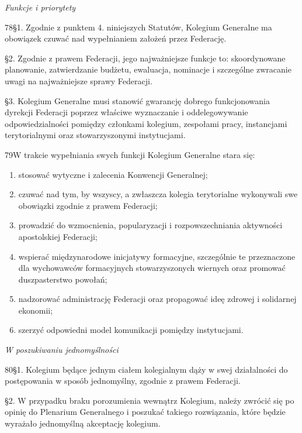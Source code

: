 ﻿\documentclass{book}
\newcommand{\lett}[1]{\lettrine[findent=6pt]{#1}}
\newcommand{\ssec}[1]{\vspace{1em}\textit{#1}\vspace{.5em}\nopagebreak}
\begin{document}
\ssec{Funkcje i priorytety}


\lett{78} \S{}1. Zgodnie z punktem 4. niniejszych Statutów, Kolegium Generalne ma obowiązek czuwać nad wypełnianiem założeń przez Federację.


\S{}2. Zgodnie z prawem Federacji, jego najważniejsze funkcje to: skoordynowane planowanie, zatwierdzanie budżetu, ewaluacja, nominacje i szczególne zwracanie uwagi na najważniejsze sprawy Federacji.


\S{}3. Kolegium Generalne musi stanowić gwarancję dobrego funkcjonowania dyrekcji Federacji poprzez właściwe wyznaczanie i oddelegowywanie odpowiedzialności pomiędzy członkami kolegium, zespołami pracy, instancjami terytorialnymi oraz stowarzyszonymi instytucjami.


\lett{79} W trakcie wypełniania swych funkcji Kolegium Generalne stara się:


\begin{enumerate}


\item stosować wytyczne i zalecenia Konwencji Generalnej;


\item czuwać nad tym, by wszyscy, a zwłaszcza kolegia terytorialne wykonywali swe obowiązki zgodnie z prawem Federacji;


\item prowadzić do wzmocnienia, popularyzacji i rozpowszechniania aktywności apostolskiej Federacji;


\item wspierać międzynarodowe inicjatywy formacyjne, szczególnie te przeznaczone dla wychowawców formacyjnych stowarzyszonych wiernych oraz promować duszpasterstwo powołań;


\item nadzorować administrację Federacji oraz propagować ideę zdrowej i solidarnej ekonomii;


\item szerzyć odpowiedni model komunikacji pomiędzy instytucjami.


\end{enumerate}
 
\ssec{W poszukiwaniu jednomyślności}




\lett{80} \S{}1. Kolegium będące jednym ciałem kolegialnym dąży w swej działalności do postępowania w sposób jednomyślny, zgodnie z prawem Federacji.


\S{}2. W przypadku braku porozumienia wewnątrz Kolegium, należy zwrócić się po opinię do Plenarium Generalnego i poszukać takiego rozwiązania, które będzie wyrażało jednomyślną akceptację kolegium.
\end{document}
